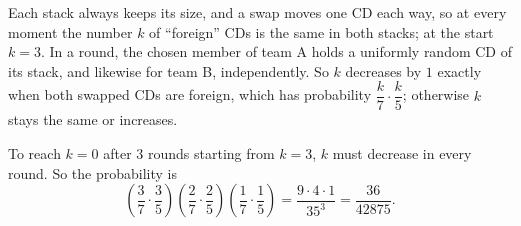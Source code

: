 Each stack always keeps its size, and a swap moves one CD each way, so at every moment the number $k$ of ``foreign'' CDs is the same in both stacks; at the start $k=3$. In a round, the chosen member of team A holds a uniformly random CD of its stack, and likewise for team B, independently. So $k$ decreases by $1$ exactly when both swapped CDs are foreign, which has probability $\dfrac k7\cdot\dfrac k5$; otherwise $k$ stays the same or increases.

To reach $k=0$ after $3$ rounds starting from $k=3$, $k$ must decrease in every round. So the probability is
\[\left(\dfrac37\cdot\dfrac35\right)\left(\dfrac27\cdot\dfrac25\right)\left(\dfrac17\cdot\dfrac15\right)=\dfrac{9\cdot4\cdot1}{35^3}=\boxed{\dfrac{36}{42875}}.\]
